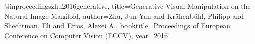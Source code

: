 @inproceedings{zhu2016generative,
  title={Generative Visual Manipulation on the Natural Image Manifold},
  author={Zhu, Jun-Yan and Kr{\"a}henb{\"u}hl, Philipp and Shechtman, Eli and Efros, Alexei A.},
  booktitle={Proceedings of European Conference on Computer Vision (ECCV)},
  year={2016}
}
